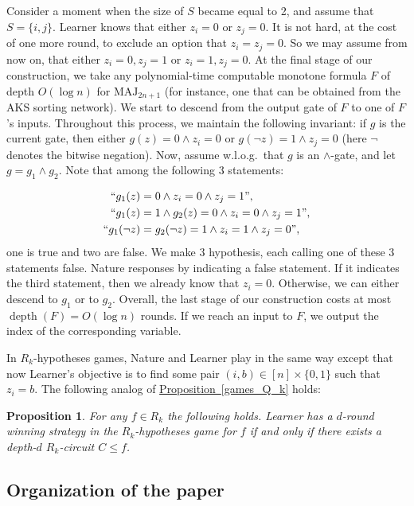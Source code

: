 \documentclass[11pt]{article}
\numberwithin{equation}{section}
\newtheorem{proposition}[theorem]{Proposition}
\theoremstyle{definition}
\theoremstyle{plain}
\newcommand{\expref}[2]{\hyperref[#2]{#1~\ref{#2}}}
\def\MAJ{\mathrm{MAJ}}
\DeclareMathOperator{\depth}{depth}  %
\begin{document}
Consider a moment when the size of $S$ became equal to 2, and assume that $S = \{i,j\}$. Learner knows that either $z_i = 0$ or $z_j = 0$.
It is not hard, at the cost of one more round, to exclude an option that $z_i = z_j = 0$. So we may assume from now on, that either $z_i = 0, z_j = 1$ or $z_i = 1, z_j = 0$.
At the final stage of our construction, we take any 
polynomial-time %
computable %
monotone formula $F$ of depth $O(\log n)$  %
for $\MAJ_{2n + 1}$ (for instance, one that can be obtained from the AKS sorting network). We start to descend  from the output gate of $F$ to one of $F$'s inputs. Throughout this process, we maintain the following invariant:  if $g$ is the current gate, then either $g(z) = 0 \land z_i = 0$ or $g(\lnot z) = 1 \land z_j = 0$ (here $\lnot$ denotes the %
bitwise  %
negation). Now, assume w.l.o.g.~that $g$ is an $\land$-gate, and let $g = g_1\land g_2$. Note that among the following 3 statements:

\begin{align*}
``g_1(z) &= 0\land z_i = 0 \land z_j = 1\mbox{''}, \\
``g_1(z) &= 1 \land g_2(z) = 0\land z_i = 0 \land z_j = 1\mbox{''}, \\
``g_1(\lnot z) &= g_2(\lnot z) = 1 \land z_i = 1 \land z_j = 0\mbox{''}, \\
\end{align*}
one is true and two are false. We make 3 hypothesis, each calling one of these 3 statements false. Nature responses by indicating a false statement. If it indicates the third statement, then we already know that $z_i = 0$. Otherwise, we can either descend to $g_1$ or to $g_2$. Overall, the last stage of our construction costs at most $\depth(F) = O(\log n)$ rounds. If we reach an input to $F$, we output the index of the corresponding variable. 

\medskip

In $R_k$-hypotheses games, Nature and Learner play in the same way except that now Learner's objective is to find some pair $(i, b) \in [n] \times \{0, 1\}$ such that $z_i =b$.  The following analog of \expref{Proposition}{games_Q_k} holds:
\begin{proposition}
\label{games_R_k}
For any $f\in R_k$ the following holds. Learner has a $d$-round winning strategy in the $R_k$-hypotheses game for $f$ if and only if there exists a
depth-$d$ $R_k$-circuit $C\le f$.
\end{proposition}

\subsection{Organization of the paper}
\end{document}
